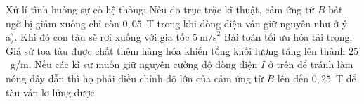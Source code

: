 \begin{ex}
		{\True Xử lí tình huống sự cố hệ thống: Nếu do trục trặc kĩ thuật, cảm ứng từ $B$ bất ngờ bị giảm xuống chỉ còn $0{,}05$~T trong khi dòng điện vẫn giữ nguyên như ở ý a). Khi đó con tàu sẽ rơi xuống với gia tốc $5~\text{m/s}^2$}
		{\True Bài toán tối ưu hóa tải trọng: Giả sử toa tàu được chất thêm hàng hóa khiến tổng khối lượng tăng lên thành $25$~g/m. Nếu các kĩ sư muốn giữ nguyên cường độ dòng điện $I$ ở trên để tránh làm nóng dây dẫn thì họ phải điều chỉnh độ lớn của cảm ứng từ $B$ lên đến $0{,}25$~T để tàu vẫn lơ lửng được}
	\end{ex}

